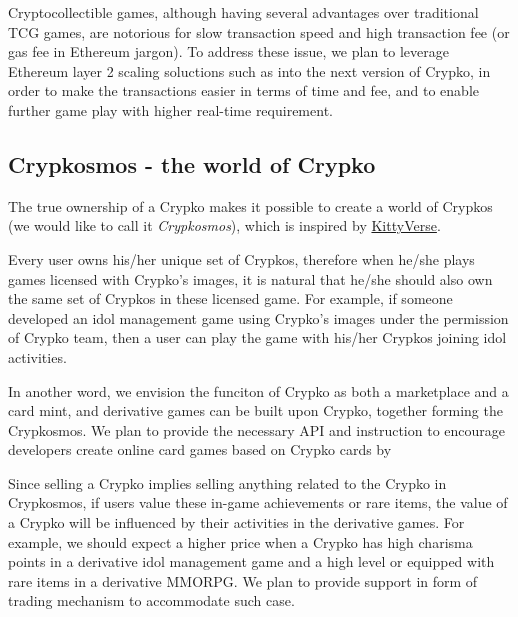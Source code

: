 \documentclass[b5paper]{article}
\begin{document}
Cryptocollectible games, although having several advantages over traditional TCG games, 
are notorious for slow transaction speed and high transaction fee (or gas fee in Ethereum jargon). 
To address these issue, we plan to leverage Ethereum layer 2 scaling soluctions such as \cite{poon2017plasma} into the next version of Crypko, in order to make the transactions easier in terms of time and fee, 
and to enable further game play with higher real-time requirement.

\subsection{Crypkosmos - the world of Crypko}

The true ownership of a Crypko makes it possible to create a world of Crypkos (we would like to call it \emph{Crypkosmos}), which is inspired by \href{https://www.cryptokitties.co/kittyverse}{KittyVerse}. 

Every user owns his/her unique set of Crypkos, 
therefore when he/she plays games licensed with Crypko's images, 
it is natural that he/she should also own the same set of Crypkos in these licensed game. 
For example, if someone developed an idol management game using Crypko's images under the permission of Crypko team, then a user can play the game with his/her Crypkos joining idol activities.

In another word, we envision the funciton of Crypko as both a marketplace and a card mint, 
and derivative games can be built upon Crypko, together forming the Crypkosmos. 
We plan to provide the necessary API and instruction to encourage developers create online card games based on Crypko cards by 

Since selling a Crypko implies selling anything related to the Crypko in Crypkosmos, 
if users value these in-game achievements or rare items, 
the value of a Crypko will be influenced by their activities in the derivative games. 
For example, we should expect a higher price when a Crypko has high charisma points in a derivative idol management game and a high level or equipped with rare items in a derivative MMORPG.
We plan to provide support in form of trading mechanism to accommodate such case.
\end{document}
